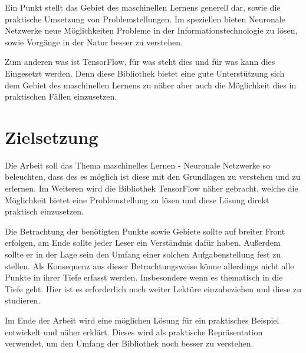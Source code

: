 \noindent
Ein Punkt stellt das Gebiet des maschinellen Lernens generell dar, sowie die praktische Umsetzung von Problemstellungen. 
Im speziellen bieten Neuronale Netzwerke neue Möglichkeiten Probleme in der Informationstechnologie zu lösen, sowie Vorgänge in der Natur besser zu verstehen. \newline

\noindent
Zum anderen was ist TensorFlow, für was steht dies und für was kann dies Eingesetzt werden. 
Denn diese Bibliothek bietet eine gute Unterstützung sich dem Gebiet des maschinellen Lernens zu näher aber auch die Möglichkeit dies in praktischen Fällen einzusetzen. 


\section{Zielsetzung}


Die Arbeit soll das Thema maschinelles Lernen - Neuronale Netzwerke so beleuchten, dass des es möglich ist diese mit den Grundlagen zu verstehen und zu erlernen. 
Im Weiteren wird die Bibliothek TensorFlow näher gebracht, welche die Möglichkeit bietet eine Problemstellung zu lösen und diese Lösung direkt praktisch einzusetzen. \newline

\noindent
Die Betrachtung der benötigten Punkte sowie Gebiete sollte auf breiter Front erfolgen, am Ende sollte jeder Leser ein Verständnis dafür haben. 
Außerdem sollte er in der Lage sein den Umfang einer solchen Aufgabenstellung fest zu stellen. 
Als Konsequenz aus dieser Betrachtungsweise könne allerdings nicht alle Punkte in ihrer Tiefe erfasst werden. 
Insbesondere wenn es thematisch in die Tiefe geht. 
Hier ist es erforderlich noch weiter Lektüre einzubeziehen und diese zu studieren. \newline

\noindent
Im Ende der Arbeit wird eine möglichen Lösung für ein praktisches Beispiel entwickelt und näher erklärt.
Dieses wird als praktische Repräsentation verwendet, um den Umfang der Bibliothek noch besser zu verstehen. \newline

